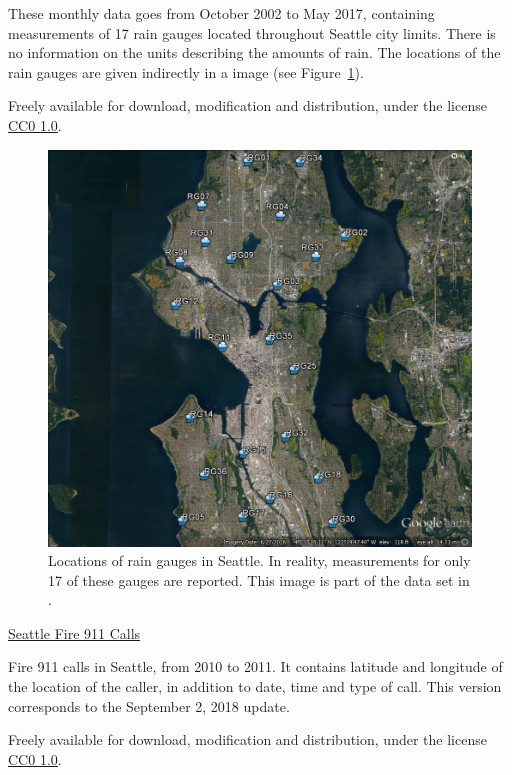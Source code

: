 \documentclass[12pt,a4paper]{article}
\begin{document}
These monthly data goes from October 2002 to May 2017, containing measurements of 17 rain gauges located throughout Seattle city limits. There is no information on the units describing the amounts of rain. The locations of the rain gauges are given indirectly in a image (see Figure~\ref{gauges}).

Freely available for download, modification and distribution, under the license \href{https://creativecommons.org/publicdomain/zero/1.0/legalcode}{CC0 1.0}.

\begin{figure}[ht!]
\centering
\includegraphics[scale=0.3]{figs/SPU_DWW_RGs.jpg}
\caption{Locations of rain gauges in Seattle. In reality, measurements for only 17 of these gauges are reported. This image is part of the data set in \cite{Daniels2018}.}
\label{gauges}
\end{figure}



{\large \href{https://data.seattle.gov/Public-Safety/Seattle-Fire-911-Calls-from-3-1-2010-to-3-1-2011/d9j6-s59d}{Seattle Fire 911 Calls} \cite{FireData2018}}

Fire 911 calls in Seattle, from 2010 to 2011. It contains latitude and longitude of the location of the caller, in addition to date, time and type of call. This version corresponds to the September 2, 2018 update.

Freely available for download, modification and distribution, under the license \href{https://creativecommons.org/publicdomain/zero/1.0/legalcode}{CC0 1.0}.
\end{document}

